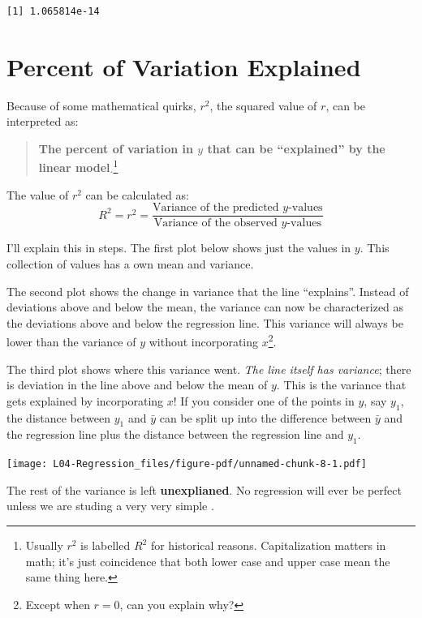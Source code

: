 \documentclass[
  letterpaper,
  DIV=11,
  numbers=noendperiod]{scrreprt}
\begin{document}
\begin{verbatim}
[1] 1.065814e-14
\end{verbatim}

\hypertarget{percent-of-variation-explained}{%
\chapter{Percent of Variation
Explained}\label{percent-of-variation-explained}}

Because of some mathematical quirks, \(r^2\), the squared value of
\(r\), can be interpreted as:

\begin{quote}
\textbf{The percent of variation in \(y\) that can be ``explained'' by
the linear model}.\footnote{Usually \(r^2\) is labelled \(R^2\) for
  historical reasons. Capitalization matters in math; it's just
  coincidence that both lower case and upper case mean the same thing
  here.}
\end{quote}

The value of \(r^2\) can be calculated as: \[
R^2 = r^2 = \frac{\text{Variance of the predicted }y\text{-values}}{\text{Variance of the observed }y\text{-values}}
\]

I'll explain this in steps. The first plot below shows just the values
in \(y\). This collection of values has a own mean and variance.

The second plot shows the change in variance that the line ``explains''.
Instead of deviations above and below the mean, the variance can now be
characterized as the deviations above and below the regression line.
This variance will always be lower than the variance of \(y\) without
incorporating \(x\)\footnote{Except when \(r=0\), can you explain why?}.

The third plot shows where this variance went. \emph{The line itself has
variance}; there is deviation in the line above and below the mean of
\(y\). This is the variance that gets explained by incorporating \(x\)!
If you consider one of the points in \(y\), say \(y_1\), the distance
between \(y_1\) and \(\bar y\) can be split up into the difference
between \(\bar y\) and the regression line plus the distance between the
regression line and \(y_1\).

\texttt{[image: L04-Regression\_files/figure-pdf/unnamed-chunk-8-1.pdf]}

The rest of the variance is left \textbf{unexplianed}. No regression
will ever be perfect unless we are studing a very very simple .
\end{document}
